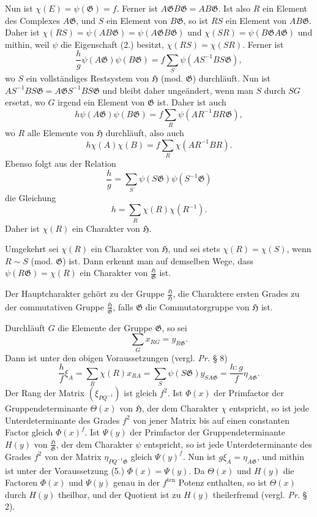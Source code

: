 \documentclass[11pt]{article}
\newcommand{\Hgrp}{\mathfrak{H}}
\newcommand{\Ggrp}{\mathfrak{G}}
\newcommand{\ten}{\mathrm{ten}}
\begin{document}
Nun ist $\chi(E)=\psi(\Ggrp)=f$. Ferner ist $A\Ggrp B\Ggrp=AB\Ggrp$. Ist also $R$ ein Element des Complexes $A\Ggrp$, und $S$ ein Element von $B\Ggrp$, so ist $RS$ ein Element von $AB\Ggrp$. Daher ist $\chi(RS)=\psi(AB\Ggrp)=\psi(A\Ggrp B\Ggrp)$ und $\chi(SR)=\psi(B\Ggrp A\Ggrp)$ und mithin, weil $\psi$ die Eigenschaft (2.) besitzt, $\chi(RS)=\chi(SR)$. Ferner ist
\[
\frac{h}{g}\psi(A\Ggrp)\psi(B\Ggrp)=f\sum_S\psi(AS^{-1}BS\Ggrp),
\]
wo $S$ ein vollständiges Restsystem von $\Hgrp$ (mod. $\Ggrp$) durchläuft. Nun ist $AS^{-1}BS\Ggrp=A\Ggrp S^{-1}BS\Ggrp$ und bleibt daher ungeändert, wenn man $S$ durch $SG$ ersetzt, wo $G$ irgend ein Element von $\Ggrp$ ist. Daher ist auch
\[
h\psi(A\Ggrp)\psi(B\Ggrp)=f\sum_R\psi(AR^{-1}BR\Ggrp),
\]
wo $R$ alle Elemente von $\Hgrp$ durchläuft, also auch
\[
h\chi(A)\chi(B)=f\sum_R\chi(AR^{-1}BR).
\]
Ebenso folgt aus der Relation
\[
\frac{h}{g}=\sum_S\psi(S\Ggrp)\psi(S^{-1}\Ggrp)
\]
die Gleichung
\[
h=\sum_R\chi(R)\chi(R^{-1}).
\]
Daher ist $\chi(R)$ ein Charakter von $\Hgrp$.

Umgekehrt sei $\chi(R)$ ein Charakter von $\Hgrp$, und sei stets $\chi(R)=\chi(S)$, wenn $R\sim S$ (mod. $\Ggrp$) ist. Dann erkennt man auf demselben Wege, dass $\psi(R\Ggrp)=\chi(R)$ ein Charakter von $\frac{\Hgrp}{\Ggrp}$ ist.

Der Hauptcharakter gehört zu der Gruppe $\frac{\Hgrp}{\Hgrp}$, die Charaktere ersten Grades zu der commutativen Gruppe $\frac{\Hgrp}{\Ggrp}$, falls $\Ggrp$ die Commutatorgruppe von $\Hgrp$ ist.

Durchläuft $G$ die Elemente der Gruppe $\Ggrp$, so sei
\begin{equation}\tag{5.}
\sum_G x_{RG}=y_{R\Ggrp}.
\end{equation}
Dann ist unter den obigen Voraussetzungen (vergl. \emph{Pr.} § 8)
\[
\frac{h}{f}\xi_A=\sum_R\chi(R)x_{RA}=\sum_S\psi(S\Ggrp)y_{SA\Ggrp}=\frac{h:g}{f}\eta_{A\Ggrp}.
\]
Der Rang der Matrix $(\xi_{PQ^{-1}})$ ist gleich $f^2$. Ist $\Phi(x)$ der Primfactor der Gruppendeterminante $\Theta(x)$ von $\Hgrp$, der dem Charakter $\chi$ entspricht, so ist jede Unterdeterminante des Grades $f^2$ von jener Matrix bis auf einen constanten Factor gleich $\Phi(x)^f$. Ist $\Psi(y)$ der Primfactor der Gruppendeterminante $H(y)$ von $\frac{\Hgrp}{\Ggrp}$, der dem Charakter $\psi$ entspricht, so ist jede Unterdeterminante des Grades $f^2$ von der Matrix $\eta_{PQ^{-1}\Ggrp}$ gleich $\Psi(y)^f$. Nun ist $g\xi_A=\eta_{A\Ggrp}$, und mithin ist unter der Voraussetzung (5.) $\Phi(x)=\Psi(y)$. Da $\Theta(x)$ und $H(y)$ die Factoren $\Phi(x)$ und $\Psi(y)$ genau in der $f^{\ten}$ Potenz enthalten, so ist $\Theta(x)$ durch $H(y)$ theilbar, und der Quotient ist zu $H(y)$ theilerfremd (vergl. \emph{Pr.} § 2).
\end{document}
